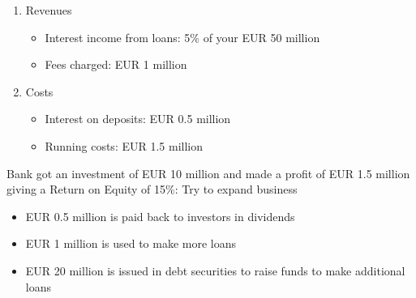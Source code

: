 \documentclass{beamer}
\begin{document}
\begin{frame}  
\begin{enumerate}
  \item Revenues
    \begin{itemize}
      \item Interest income from loans:  5\% of your EUR 50 million
      \item Fees charged: EUR 1 million
    \end{itemize}
  \item Costs
    \begin{itemize}
      \item Interest on deposits: EUR 0.5 million
      \item Running costs: EUR 1.5 million
    \end{itemize}
\end{enumerate}
\end{frame}
\begin{frame}
\begin{table}[!h] \centering
\caption{Income statement}
\end{table}
\end{frame}
\begin{frame}
 Bank got an investment of EUR 10 million and made a profit of EUR 1.5 million giving a Return on Equity of 15\%:
 Try to expand business
\begin{itemize}
  \item EUR 0.5 million is paid back to investors in dividends
  \item EUR 1 million is used to make more loans
  \item EUR 20 million is issued in debt securities to raise funds to make additional loans
\end{itemize}
\end{frame}
\end{document}
